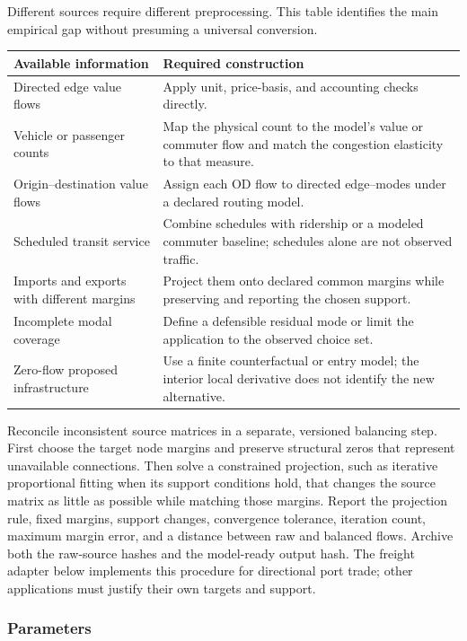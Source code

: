 Different sources require different preprocessing. This table identifies the
main empirical gap without presuming a universal conversion.
\begin{longtable}{L{0.34\textwidth}L{0.57\textwidth}}
\toprule
Available information & Required construction \\
\midrule
\endhead
Directed edge value flows &
Apply unit, price-basis, and accounting checks directly. \\
Vehicle or passenger counts &
Map the physical count to the model's value or commuter flow and match the
congestion elasticity to that measure. \\
Origin--destination value flows &
Assign each OD flow to directed edge--modes under a declared routing model. \\
Scheduled transit service &
Combine schedules with ridership or a modeled commuter baseline; schedules
alone are not observed traffic. \\
Imports and exports with different margins &
Project them onto declared common margins while preserving and reporting the
chosen support. \\
Incomplete modal coverage &
Define a defensible residual mode or limit the application to the observed
choice set. \\
Zero-flow proposed infrastructure &
Use a finite counterfactual or entry model; the interior local derivative does
not identify the new alternative. \\
\bottomrule
\end{longtable}

Reconcile inconsistent source matrices in a separate, versioned balancing
step. First choose the target node margins and preserve
structural zeros that represent unavailable connections. Then solve a
constrained projection, such as iterative proportional fitting when its
support conditions hold, that changes the source matrix as little as possible
while matching those margins. Report the projection rule, fixed margins,
support changes, convergence tolerance, iteration count, maximum margin error,
and a distance between raw and balanced flows. Archive both the raw-source
hashes and the model-ready output hash. The freight adapter below implements
this procedure for directional port trade; other applications must justify
their own targets and support.

\subsubsection{Parameters}


